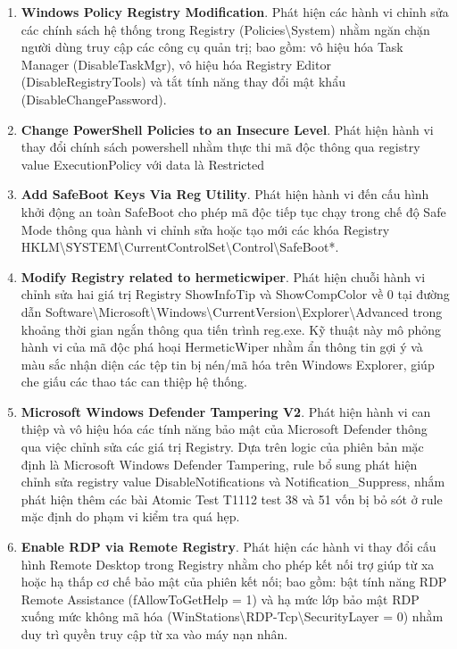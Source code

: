 \begin{enumerate}
\item \textbf{Windows Policy Registry Modification}. Phát hiện các hành vi chỉnh sửa các chính sách hệ thống trong Registry (Policies\textbackslash{}System) nhằm ngăn chặn người dùng truy cập các công cụ quản trị; bao gồm: vô hiệu hóa Task Manager (DisableTaskMgr), vô hiệu hóa Registry Editor (DisableRegistryTools) và tắt tính năng thay đổi mật khẩu (DisableChangePassword).
\item \textbf{Change PowerShell Policies to an Insecure Level}. Phát hiện hành vi thay đổi chính sách powershell nhằm thực thi mã độc thông qua registry value ExecutionPolicy với data là Restricted
\item \textbf{Add SafeBoot Keys Via Reg Utility}. Phát hiện hành vi đến cấu hình khởi động an toàn SafeBoot cho phép mã độc tiếp tục chạy trong chế độ Safe Mode thông qua hành vi chỉnh sửa hoặc tạo mới các khóa Registry HKLM\textbackslash{}SYSTEM\textbackslash{}CurrentControlSet\textbackslash{}Control\textbackslash{}SafeBoot*.
\item \textbf{Modify Registry related to hermeticwiper}. Phát hiện chuỗi hành vi chỉnh sửa hai giá trị Registry ShowInfoTip và ShowCompColor về 0 tại đường dẫn Software\textbackslash{}Microsoft\textbackslash{}Windows\textbackslash{}CurrentVersion\textbackslash{}Explorer\textbackslash{}Advanced trong khoảng thời gian ngắn thông qua tiến trình reg.exe. Kỹ thuật này mô phỏng hành vi của mã độc phá hoại HermeticWiper nhằm ẩn thông tin gợi ý và màu sắc nhận diện các tệp tin bị nén/mã hóa trên Windows Explorer, giúp che giấu các thao tác can thiệp hệ thống.
\item \textbf{Microsoft Windows Defender Tampering V2}. Phát hiện hành vi can thiệp và vô hiệu hóa các tính năng bảo mật của Microsoft Defender thông qua việc chỉnh sửa các giá trị Registry. Dựa trên logic của phiên bản mặc định là Microsoft Windows Defender Tampering, rule bổ sung phát hiện chỉnh sửa registry value DisableNotifications và Notification\_Suppress, nhắm phát hiện thêm các bài Atomic Test T1112 test 38 và 51 vốn bị bỏ sót ở rule mặc định do phạm vi kiểm tra quá hẹp.
\item \textbf{Enable RDP via Remote Registry}. Phát hiện các hành vi thay đổi cấu hình Remote Desktop trong Registry nhằm cho phép kết nối trợ giúp từ xa hoặc hạ thấp cơ chế bảo mật của phiên kết nối; bao gồm: bật tính năng RDP Remote Assistance (fAllowToGetHelp = 1) và hạ mức lớp bảo mật RDP xuống mức không mã hóa (WinStations\textbackslash{}RDP-Tcp\textbackslash{}SecurityLayer = 0) nhằm duy trì quyền truy cập từ xa vào máy nạn nhân.

\end{enumerate}
